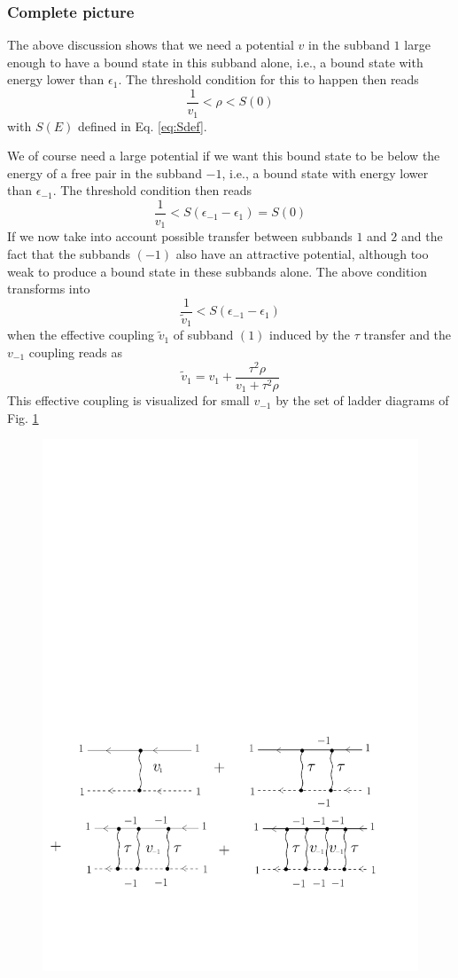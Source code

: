 \documentclass[11pt]{article} %
\begin{document}
\subsubsection{Complete picture}
The above discussion shows that we need a potential $v$ in the subband $1$ large enough to have a bound state in this subband alone, i.e., a bound state with energy lower than $\epsilon_1$.  The threshold condition for this to happen then reads
\begin{equation}
\frac{1}{v_1}<\rho<S(0)
\end{equation}
with $S(E)$ defined in Eq. \ref{eq:Sdef}.  

We of course need a large potential if we want this bound state to be below the energy of a free pair in the subband $-1$, i.e., a bound state with energy lower than $\epsilon_{-1}$.  The threshold condition then reads
\begin{equation}
\frac{1}{v_1}<S(\epsilon_{-1}-\epsilon_1)=S(0)
\end{equation}
If we now take into account possible transfer between subbands $1$ and $2$ and the fact that the subbands $(-1)$ also have an attractive potential, although too weak to produce a bound state in these subbands alone. The above condition transforms into 
\begin{equation}
\frac{1}{\tilde{v}_1}<S(\epsilon_{-1}-\epsilon_1)
\end{equation}
when the effective coupling $\tilde{v}_1$ of subband $(1)$ induced by the $\tau$ transfer and the $v_{-1}$ coupling reads as 
\begin{equation}
\tilde{v}_1=v_1+\frac{\tau^2\rho}{v_{1}+\tau^{2}\rho}
\end{equation}
This effective coupling is visualized for small $v_{-1}$ by the set of ladder diagrams of Fig. \ref{fig:ladder}


\begin{figure}[htb]
	\centering
	       \includegraphics[width=.6\textwidth]{ladder}
			\caption{\label{fig:ladder}}
\end{figure}
\end{document}
